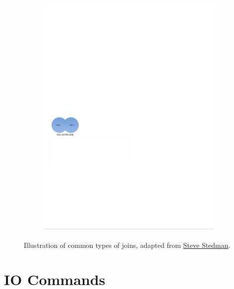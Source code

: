 \begin{figure}[H]
\begin{subfigure}[c]{0.3\textwidth}
  \includegraphics[width=\textwidth]{figures/sql/full_outer_join.pdf}
  \label{fig:sql:joins:full_outer_join}
  \end{subfigure}
\caption{
Illustration of common types of joins, adapted from \href{http://stevestedman.com/2015/03/sql-server-join-types-poster-version-2}{Steve Stedman}.
}
\label{fig:sql:joins}
\end{figure}

\section{IO Commands}
\label{sql:io}

